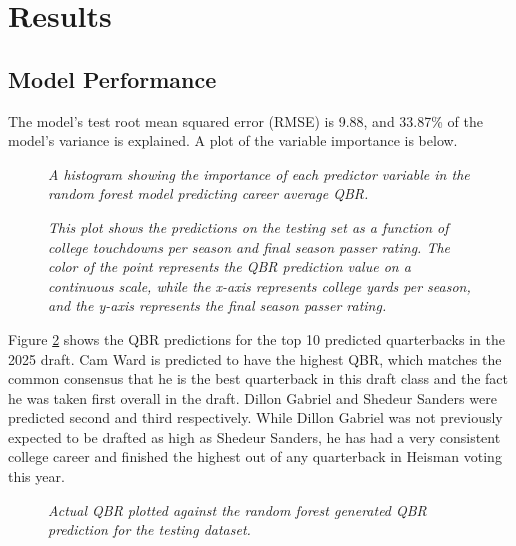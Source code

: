 \documentclass{article}
\begin{document}
\section{Results}
\label{sec:results}

\subsection{Model Performance}

The model's test root mean squared error (RMSE) is 9.88, and 33.87\% of the model's variance is explained. A plot of the variable importance is below. 

\begin{figure}[H]
    \centering
    \caption{\textit{A histogram showing the importance of each predictor variable in the random forest model predicting career average QBR.}}
    \label{fig:importance}
\end{figure}

\begin{figure}[H]
    \centering
    \caption{\textit{This plot shows the predictions on the testing set as a function of college touchdowns per season and final season passer rating. The color of the point represents the QBR prediction value on a continuous scale, while the x-axis represents college yards per season, and the y-axis represents the final season passer rating.}}
\end{figure}

Figure \ref{fig:predicted-vs-actuals} shows the QBR predictions for the top 10 predicted quarterbacks in the 2025 draft. Cam Ward is predicted to have the highest QBR, which matches the common consensus that he is the best quarterback in this draft class and the fact he was taken first overall in the draft. Dillon Gabriel and Shedeur Sanders were predicted second and third respectively. While Dillon Gabriel was not previously expected to be drafted as high as Shedeur Sanders, he has had a very consistent college career and finished the highest out of any quarterback in Heisman voting this year.

\begin{figure}[H]
    \centering
    \caption{\textit{Actual QBR plotted against the random forest generated QBR prediction for the testing dataset.}}
    \label{fig:predicted-vs-actuals}
\end{figure}
\end{document}
